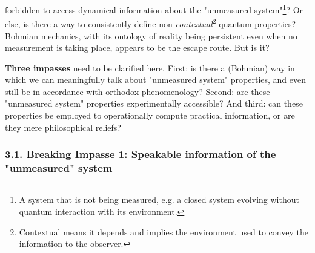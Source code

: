 \documentclass[11pt, a4paper]{article} %
\begin{document}
forbidden to access dynamical information about the "unmeasured system"\footnote{A system that is not being measured, e.g. a closed system evolving without quantum interaction with its environment.}? Or else, is there a way to consistently define non-{\em contextual}\footnote{Contextual means it depends and implies the environment used to convey the information to the observer.} quantum properties? Bohmian mechanics, with its ontology of reality being persistent even when no measurement is taking place, appears to be the escape route. But is it?  \vspace{-0.15cm}

{\bf Three impasses} need to be clarified here. First: is there a (Bohmian) way in which we can meaningfully talk about "unmeasured system" properties, and even still be in accordance with orthodox phenomenology? Second: are these "unmeasured system" properties experimentally accessible? And third: can these properties be employed to operationally compute practical information, or are they mere philosophical reliefs?\vspace{-0.3cm}

\subsubsection*{3.1. Breaking Impasse 1: Speakable information of the "unmeasured" system}\vspace{-0.15cm}
\end{document}
